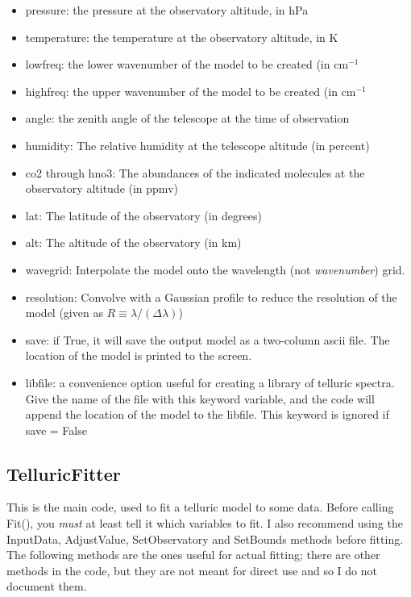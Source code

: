 \documentclass{article}
\begin{document}
\begin{itemize}
\begin{itemize}
     \item pressure: the pressure at the observatory altitude, in hPa
     \item temperature: the temperature at the observatory altitude, in K
     \item lowfreq: the lower wavenumber of the model to be created (in cm$^{-1}$
     \item highfreq: the upper wavenumber of the model to be created (in cm$^{-1}$
     \item angle: the zenith angle of the telescope at the time of observation
     \item humidity: The relative humidity at the telescope altitude (in percent)
     \item co2 through hno3: The abundances of the indicated molecules at the observatory altitude (in ppmv)
     \item lat: The latitude of the observatory (in degrees)
     \item alt: The altitude of the observatory (in km)
     \item wavegrid: Interpolate the model onto the wavelength (not \emph{wavenumber}) grid.
     \item resolution: Convolve with a Gaussian profile to reduce the resolution of the model (given as $R\equiv \lambda/(\Delta \lambda)$)
     \item save: if True, it will save the output model as a two-column ascii file. The location of the model is printed to the screen.
     \item libfile: a convenience option useful for creating a library of telluric spectra. Give the name of the file with this keyword variable, and the code will append the location of the model to the libfile. This keyword is ignored if save = False
     
     
   \end{itemize}
   
   
\end{itemize}

\subsection{TelluricFitter}
This is the main code, used to fit a telluric model to some data. Before calling Fit(), you \emph{must} at least tell it which variables to fit. I also recommend using the InputData, AdjustValue, SetObservatory and SetBounds methods before fitting. The following methods are the ones useful for actual fitting; there are other methods in the code, but they are not meant for direct use and so I do not document them.
\end{document}
